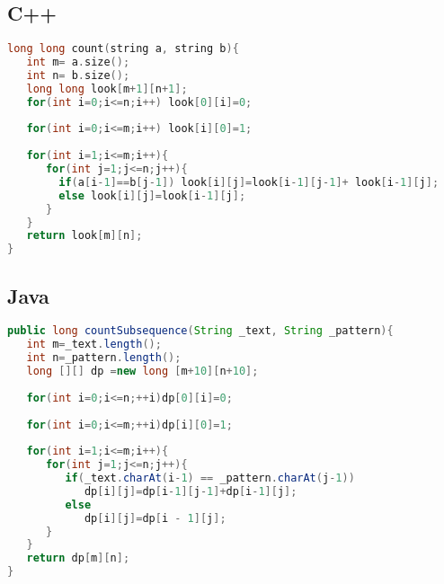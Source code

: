 \subsection{C++}
\begin{lstlisting}[language=C++]
long long count(string a, string b){
   int m= a.size();
   int n= b.size();
   long long look[m+1][n+1];
   for(int i=0;i<=n;i++) look[0][i]=0;
   
   for(int i=0;i<=m;i++) look[i][0]=1;
   
   for(int i=1;i<=m;i++){
      for(int j=1;j<=n;j++){
        if(a[i-1]==b[j-1]) look[i][j]=look[i-1][j-1]+ look[i-1][j];
        else look[i][j]=look[i-1][j];
      }
   }
   return look[m][n];
}
\end{lstlisting}
\subsection{Java}

\begin{lstlisting}[language=Java]
public long countSubsequence(String _text, String _pattern){
   int m=_text.length();
   int n=_pattern.length();
   long [][] dp =new long [m+10][n+10]; 
	
   for(int i=0;i<=n;++i)dp[0][i]=0;
	
   for(int i=0;i<=m;++i)dp[i][0]=1;
   
   for(int i=1;i<=m;i++){
      for(int j=1;j<=n;j++){
         if(_text.charAt(i-1) == _pattern.charAt(j-1))
            dp[i][j]=dp[i-1][j-1]+dp[i-1][j];
         else
            dp[i][j]=dp[i - 1][j];
      }
   }
   return dp[m][n];
}
\end{lstlisting}